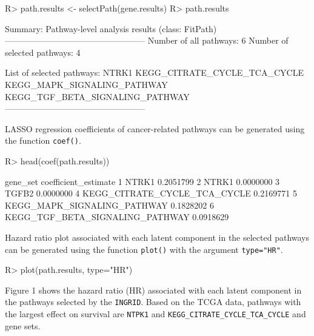 \documentclass[11pt]{article}
\begin{document}
\begin{Schunk}
\begin{Sinput}
R> path.results <- selectPath(gene.results)
R> path.results
\end{Sinput}
\begin{Soutput}
Summary: Pathway-level analysis results (class: FitPath)
--------------------------------------------------
Number of all pathways: 6
Number of selected pathways: 4

List of selected pathways:
	NTRK1
	KEGG_CITRATE_CYCLE_TCA_CYCLE
	KEGG_MAPK_SIGNALING_PATHWAY
	KEGG_TGF_BETA_SIGNALING_PATHWAY
--------------------------------------------------
\end{Soutput}
\end{Schunk}

LASSO regression coefficients of cancer-related pathways can be generated using the function \texttt{coef()}.

\begin{Schunk}
\begin{Sinput}
R> head(coef(path.results))
\end{Sinput}
\begin{Soutput}
                         gene_set coefficient_estimate
1                           NTRK1            0.2051799
2                           NTRK1            0.0000000
3                           TGFB2            0.0000000
4    KEGG_CITRATE_CYCLE_TCA_CYCLE            0.2169771
5     KEGG_MAPK_SIGNALING_PATHWAY            0.1828202
6 KEGG_TGF_BETA_SIGNALING_PATHWAY            0.0918629
\end{Soutput}
\end{Schunk}

Hazard ratio plot associated with each latent component in the selected pathways can be generated using the function \texttt{plot()} with the argument \texttt{type="{}HR"{}}.

\begin{Schunk}
\begin{Sinput}
R> plot(path.results, type="HR")
\end{Sinput}
\end{Schunk}

Figure 1 shows the hazard ratio (HR) associated with each latent component in the pathways selected by the \texttt{INGRID}.
Based on the TCGA data, pathways with the largest effect on survival are \texttt{NTPK1} and \texttt{KEGG\_CITRATE\_CYCLE\_TCA\_CYCLE} and  gene sets.
\end{document}
